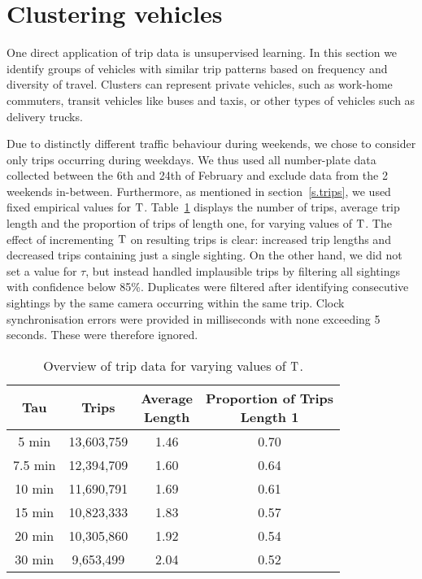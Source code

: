 \section{Clustering vehicles}\label{s.classification}

One direct application of trip data is unsupervised learning. In this section we identify groups of vehicles with similar trip patterns based on frequency and diversity of travel. Clusters can represent private vehicles, such as work-home commuters, transit vehicles like buses and taxis, or other types of vehicles such as delivery trucks.

Due to distinctly different traffic behaviour during weekends, we chose to consider only trips occurring during weekdays. We thus used all number-plate data collected between the 6th and 24th of February and exclude data from the 2 weekends in-between. Furthermore, as mentioned in section~\ref{s.trips}, we used fixed empirical values for $\mathrm{T}$. Table~\ref{t:trips-tau} displays the number of trips, average trip length and the proportion of trips of length one, for varying values of $\mathrm{T}$. The effect of incrementing $\mathrm{T}$ on resulting trips is clear: increased trip lengths and decreased trips containing just a single sighting. On the other hand, we did not set a value for $\tau$, but instead handled implausible trips by filtering all sightings with confidence below 85\%. Duplicates were filtered after identifying consecutive sightings by the same camera occurring within the same trip. Clock synchronisation errors were provided in milliseconds with none exceeding 5 seconds. These were therefore ignored.

\begin{table}[t]
\centering
\tabcolsep=0.25cm
\begin{tabular}{c c c c}
  \hline
Tau & Trips & \thead{Average\\Length} & \thead{Proportion of Trips \\ Length 1} \\
  \hline
5 min & 13,603,759 & 1.46 & 0.70 \\
7.5 min & 12,394,709 & 1.60 & 0.64 \\
10 min & 11,690,791 & 1.69 & 0.61 \\
15 min & 10,823,333 & 1.83 & 0.57 \\
20 min & 10,305,860 & 1.92 & 0.54 \\
30 min &  9,653,499 & 2.04 & 0.52 \\
   \hline
\end{tabular}
\caption{Overview of trip data for varying values of $\mathrm{T}$.}
\label{t:trips-tau}
\vspace{-0.5cm}
\end{table}

